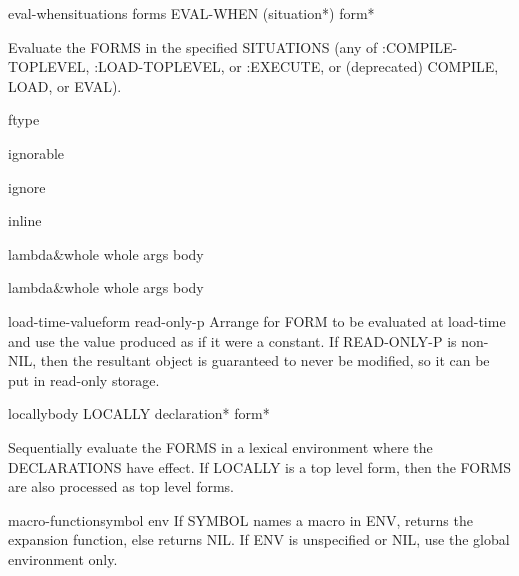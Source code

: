 \begin{specialop}{eval-when}{situations \rest forms}{}
  EVAL-WHEN (situation*) form*

Evaluate the FORMS in the specified SITUATIONS (any of :COMPILE-TOPLEVEL,
:LOAD-TOPLEVEL, or :EXECUTE, or (deprecated) COMPILE, LOAD, or EVAL).
\end{specialop}

\begin{declaration}{ftype}{}{}
  
\end{declaration}

\begin{declaration}{ignorable}{}{}
  
\end{declaration}

\begin{declaration}{ignore}{}{}
  
\end{declaration}

\begin{declaration}{inline}{}{}
  
\end{declaration}

\begin{macro}{lambda}{&whole whole args \body body}{}
  
\end{macro}

\begin{symbol}{lambda}{&whole whole args \body body}{}
  
\end{symbol}

\begin{specialop}{load-time-value}{form \op read-only-p}{}
  Arrange for FORM to be evaluated at load-time and use the value produced
   as if it were a constant. If READ-ONLY-P is non-NIL, then the resultant
   object is guaranteed to never be modified, so it can be put in read-only
   storage.
\end{specialop}

\begin{specialop}{locally}{\body body}{}
  LOCALLY declaration* form*

Sequentially evaluate the FORMS in a lexical environment where the
DECLARATIONS have effect. If LOCALLY is a top level form, then the FORMS are
also processed as top level forms.
\end{specialop}

\begin{accessor}{macro-function}{symbol \op env}{}
  If SYMBOL names a macro in ENV, returns the expansion function,
else returns NIL. If ENV is unspecified or NIL, use the global environment
only.
\end{accessor}

